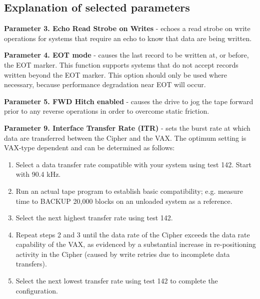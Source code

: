 \subsection{Explanation of selected parameters}

{\bf Parameter 3. Echo Read Strobe on Writes} - echoes a read strobe on write
operations for systems that require an echo to know that data are being written.

{\bf Parameter 4. EOT mode} - causes the last record to be written at, or
before, the EOT marker. This function supports systems that do not accept
records written beyond the EOT marker. This option should only be
used where necessary, because performance degradation near EOT will occur.

{\bf Parameter 5. FWD Hitch enabled} - causes the drive to jog the tape
forward prior to any reverse operations in order to overcome static friction.

{\bf Parameter 9.  Interface Transfer Rate (ITR)} - sets the burst rate at
which data are transferred between the Cipher and the VAX. The
optimum setting is VAX-type dependent and
can be determined as follows:

\begin{enumerate}

\item Select a data transfer rate compatible with your system using test 142.
Start with 90.4 kHz.

\item Run an actual tape program to establish basic compatibility; e.g. measure
time to BACKUP 20,000 blocks on an unloaded system as a reference.


\item Select the next highest transfer rate using test 142.

\item Repeat steps 2 and 3 until the data rate of the Cipher exceeds
the data rate capability of the VAX, as evidenced by a substantial increase
in re-positioning activity in the Cipher (caused by write retries
due to incomplete data transfers).

\item Select the next lowest transfer rate using test 142 to complete
the configuration.

\end{enumerate}

